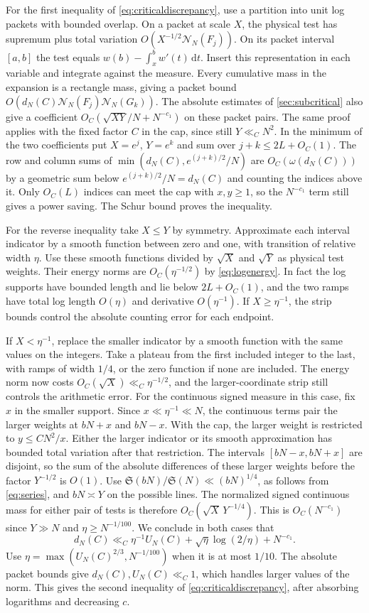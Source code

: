 \documentclass[11pt,a4paper]{article}
\numberwithin{equation}{section}
\newcommand{\SSS}{\mathfrak S}
\newcommand{\ud}{\mathrm d}
\newcommand{\NN}{\mathcal N_N}
\begin{document}
For the first inequality of \cref{eq:criticaldiscrepancy},
use a partition into unit log packets with bounded overlap.
On a packet at scale $X$, the physical test has supremum
plus total variation $O(X^{-1/2}\NN(F_j))$. On its packet
interval $[a,b]$ the test equals $w(b)-\int_x^b w'(t)\,\ud t$.
Insert this representation in each variable and integrate
against the measure. Every cumulative mass in the expansion
is a rectangle mass, giving a packet bound
$O(d_N(C)\NN(F_j)\NN(G_k))$.
The absolute estimates of \cref{sec:subcritical} also give
a coefficient $O_C(\sqrt{XY}/N+N^{-c_1})$ on these packet
pairs. The same proof applies with the fixed factor $C$
in the cap, since still $Y\ll_C N^2$.
In the minimum of the two coefficients put
$X=e^j$, $Y=e^k$ and sum over $j+k\le 2L+O_C(1)$.
The row and column sums of $\min(d_N(C),e^{(j+k)/2}/N)$
are $O_C(\omega(d_N(C)))$ by a geometric sum below
$e^{(j+k)/2}/N=d_N(C)$ and counting the indices above it.
Only $O_C(L)$ indices can meet the cap with $x,y\ge1$,
so the $N^{-c_1}$ term still gives a power saving.
The Schur bound proves the inequality.

For the reverse inequality take $X\le Y$ by symmetry.
Approximate each interval indicator by a smooth function
between zero and one, with transition of relative width
$\eta$. Use these smooth functions divided by $\sqrt X$
and $\sqrt Y$ as physical test weights.
Their energy norms are $O_C(\eta^{-1/2})$ by
\cref{eq:logenergy}. In fact the log supports have bounded
length and lie below $2L+O_C(1)$, and the two ramps have
total log length $O(\eta)$ and derivative $O(\eta^{-1})$.
If $X\ge\eta^{-1}$, the strip bounds control the absolute
counting error for each endpoint.

If $X<\eta^{-1}$, replace the smaller indicator by a
smooth function with the same values on the integers.
Take a plateau from the first included integer to the last,
with ramps of width $1/4$, or the zero function if none
are included. The energy norm now costs $O_C(\sqrt X)
\ll_C\eta^{-1/2}$, and the larger-coordinate strip still
controls the arithmetic error.
For the continuous signed measure in this case, fix $x$
in the smaller support. Since $x\ll\eta^{-1}\ll N$,
the continuous terms pair the larger weights at $bN+x$
and $bN-x$. With the cap, the larger weight is restricted
to $y\le CN^2/x$. Either the larger indicator or its
smooth approximation has bounded total variation after
that restriction. The intervals $[bN-x,bN+x]$ are disjoint,
so the sum of the absolute differences of these larger
weights before the factor $Y^{-1/2}$ is $O(1)$.
Use $\SSS(bN)/\SSS(N)\ll(bN)^{1/4}$, as follows
from \cref{eq:series}, and $bN\asymp Y$ on the possible
lines. The normalized signed continuous mass for either
pair of tests is therefore $O_C(\sqrt X\,Y^{-1/4})$.
This is $O_C(N^{-c_1})$ since $Y\gg N$ and
$\eta\ge N^{-1/100}$. We conclude in both cases that
\[
 d_N(C)\ll_C
    \eta^{-1}U_N(C)+\sqrt\eta\log(2/\eta)+N^{-c_1}.
\]
Use $\eta=\max(U_N(C)^{2/3},N^{-1/100})$ when it is
at most $1/10$. The absolute packet bounds give
$d_N(C),U_N(C)\ll_C1$, which handles larger values of the
norm. This gives the second inequality of
\cref{eq:criticaldiscrepancy}, after absorbing logarithms
and decreasing $c$.
\end{document}
